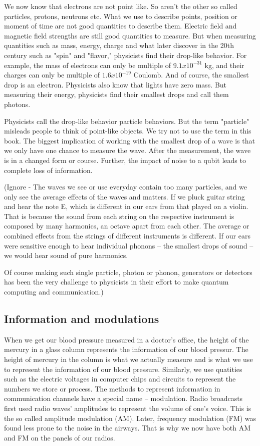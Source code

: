 \documentclass{book}
\begin{document}
We now know that electrons are not point like. So aren't the other so called particles, protons, neutrons etc. What we use to describe points, position or moment of time are not good quantities to describe them. Electric field and magnetic field strengths are still good quantities to measure. But when measuring quantities such as mass, energy, charge and what later discover in the 20th century such as "spin" and "flavor," physicists find their drop-like behavior. For example, the mass of electrons can only be multiple of $9.1x10^{-31}$ kg, and their charges can only be multiple of $1.6x10^{-19}$ Coulomb. And of course, the smallest drop is an electron. Physicists also know that lights have zero mass. But measuring their energy, physicists find their smallest drops and call them photons.

Physicists call the drop-like behavior particle behaviors. But the term "particle" misleads people to think of point-like objects. We try not to use the term in this book. The biggest implication of working with the smallest drop of a wave is that we only have one chance to measure the wave. After the measurement, the wave is in a changed form or course. Further, the impact of noise to a qubit leads to complete loss of information.

(Ignore - The waves we see or use everyday contain too many particles, and we only see the average effects of the waves and matters. If we pluck guitar string and hear the note E, which is different in our ears from that played on a violin. That is because the sound from each string on the respective instrument is composed by many harmonics, an octave apart from each other. The average or combined effects from the strings of different instruments is different. If our ears were sensitive enough to hear individual phonons -- the smallest drops of sound -- we would hear sound of pure harmonics.

Of course making such single particle, photon or phonon, generators or detectors has been the very challenge to physicists in their effort to make quantum computing and communication.)

\subsection{Information and modulations}
When we get our blood pressure measured in a doctor's office, the height of the mercury in a glass column represents the information of our blood pressur. The height of mercury in the column is what we actually measure and is what we use to represent the information of our blood pressure. Similarly, we use quatities such as the electric voltages in computer chips and circuits to represent the numbers we store or process. The methods to represent information in communication channels have a special name -- modulation. Radio broadcasts first used radio waves' amplitudes to represent the volume of one's voice. This is the so called amplitude modulation (AM). Later, frequency modulation (FM) was found less prone to the noise in the airways. That is why we now have both AM and FM on the panels of our radios.
\end{document}
